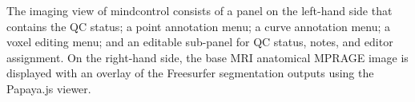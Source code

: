 \label{fig:imagingview}
The imaging view of mindcontrol consists of a panel on the left-hand side that contains the QC status; a point annotation menu; a curve annotation menu; a voxel editing menu; and an editable sub-panel for QC status, notes, and editor assignment. On the right-hand side, the base MRI anatomical MPRAGE image is displayed with an overlay of the Freesurfer segmentation outputs using the Papaya.js viewer. 